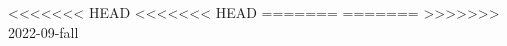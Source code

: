 \documentclass{../../oss-apphys-exam}
\begin{document}
\begin{multicols*}{2}
\begin{questions}
\begin{choices}
\begin{choices}
%    
<<<<<<< HEAD
<<<<<<< HEAD
%
%
=======
=======
>>>>>>> 2022-09-fall


\end{choices}
\end{choices}
\end{questions}
\end{multicols*}
\end{document}

